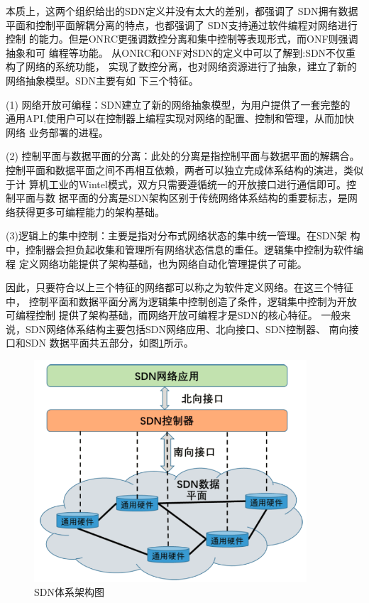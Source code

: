 本质上，这两个组织给出的SDN定义并没有太大的差别，都强调了 SDN拥有数据 平面和控制平面解耦分离的特点，也都强调了 SDN支持通过软件编程对网络进行控制 的能力。但是ONRC更强调数控分离和集中控制等表现形式，而ONF则强调抽象和可 编程等功能。
从ONRC和ONF对SDN的定义中可以了解到:SDN不仅重构了网络的系统功能， 实现了数控分离，也对网络资源进行了抽象，建立了新的网络抽象模型。SDN主要有如 下三个特征。

(1)	网络开放可编程：SDN建立了新的网络抽象模型，为用户提供了一套完整的 通用API,使用户可以在控制器上编程实现对网络的配置、控制和管理，从而加快网络 业务部署的进程。

(2)	控制平面与数据平面的分离：此处的分离是指控制平面与数据平面的解耦合。 控制平面和数据平面之间不再相互依赖，两者可以独立完成体系结构的演进，类似于计 算机工业的Wintel模式，双方只需要遵循统一的开放接口进行通信即可。控制平面与数 据平面的分离是SDN架构区别于传统网络体系结构的重要标志，是网络获得更多可编程能力的架构基础。

(3)逻辑上的集中控制：主要是指对分布式网络状态的集中统一管理。在SDN架 构中，控制器会担负起收集和管理所有网络状态信息的重任。逻辑集中控制为软件编程 定义网络功能提供了架构基础，也为网络自动化管理提供了可能。

因此，只要符合以上三个特征的网络都可以称之为软件定义网络。在这三个特征中， 控制平面和数据平面分离为逻辑集中控制创造了条件，逻辑集中控制为开放可编程控制 提供了架构基础，而网络开放可编程才是SDN的核心特征。
一般来说，SDN网络体系结构主要包括SDN网络应用、北向接口、SDN控制器、 南向接口和SDN 数据平面共五部分，如图\ref{fig:SDNArchitectureDiagram}所示。

\begin{figure}[htbp]
\centering
\includegraphics[width=4.0in]{figures/SDNArchitectureDiagram}
  \caption{SDN体系架构图}
  \label{fig:SDNArchitectureDiagram}
\end{figure}

